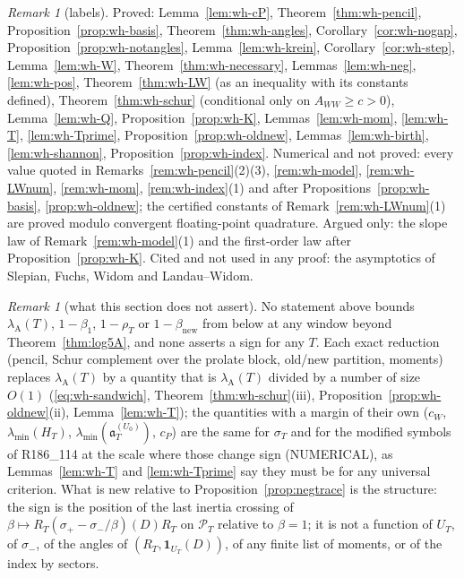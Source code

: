 \documentclass[11pt]{amsart}
\theoremstyle{definition}
\theoremstyle{remark}
\newtheorem{remark}[theorem]{Remark}
\newcommand{\PT}{\mathcal P_T}
\newcommand{\sT}{\sigma_T}
\newcommand{\DraftStandalone}{}
\begin{document}
\begin{remark}[labels]\label{rem:wh-labels}
Proved: Lemma~\ref{lem:wh-cP}, Theorem~\ref{thm:wh-pencil}, Proposition~\ref{prop:wh-basis}, Theorem~\ref{thm:wh-angles},
Corollary~\ref{cor:wh-nogap}, Proposition~\ref{prop:wh-notangles}, Lemma~\ref{lem:wh-krein}, Corollary~\ref{cor:wh-step},
Lemma~\ref{lem:wh-W}, Theorem~\ref{thm:wh-necessary}, Lemmas~\ref{lem:wh-neg}, \ref{lem:wh-pos}, Theorem~\ref{thm:wh-LW} (as an
inequality with its constants defined), Theorem~\ref{thm:wh-schur} (conditional only on $A_{WW}\ge c>0$), Lemma~\ref{lem:wh-Q},
Proposition~\ref{prop:wh-K}, Lemmas~\ref{lem:wh-mom}, \ref{lem:wh-T}, \ref{lem:wh-Tprime}, Proposition~\ref{prop:wh-oldnew},
Lemmas~\ref{lem:wh-birth}, \ref{lem:wh-shannon}, Proposition~\ref{prop:wh-index}. Numerical and not proved: every value quoted in
Remarks~\ref{rem:wh-pencil}(2)(3), \ref{rem:wh-model}, \ref{rem:wh-LWnum}, \ref{rem:wh-mom}, \ref{rem:wh-index}(1) and after
Propositions~\ref{prop:wh-basis}, \ref{prop:wh-oldnew}; the certified constants of Remark~\ref{rem:wh-LWnum}(1) are proved modulo
convergent floating-point quadrature. Argued only: the slope law of Remark~\ref{rem:wh-model}(1) and the first-order law after
Proposition~\ref{prop:wh-K}. Cited and not used in any proof: the asymptotics of Slepian, Fuchs, Widom and Landau--Widom.
\end{remark}

\begin{remark}[what this section does not assert]\label{rem:wh-honest}
No statement above bounds $\lambda_{\mathrm A}(T)$, $1-\beta_1$, $1-\rho_T$ or $1-\beta_{\mathrm{new}}$ from below at any window beyond
Theorem~\ref{thm:log5A}, and none asserts a sign for any $T$. Each exact reduction (pencil, Schur complement over the prolate block,
old/new partition, moments) replaces $\lambda_{\mathrm A}(T)$ by a quantity that is $\lambda_{\mathrm A}(T)$ divided by a number of size
$O(1)$ (\eqref{eq:wh-sandwich}, Theorem~\ref{thm:wh-schur}(iii), Proposition~\ref{prop:wh-oldnew}(ii), Lemma~\ref{lem:wh-T}); the
quantities with a margin of their own ($c_W$, $\lambda_{\min}(H_T)$, $\lambda_{\min}(\mathfrak a^{(U_0)}_T)$, $c_P$) are the same for $\sT$
and for the modified symbols of R186\_114 at the scale where those change sign (NUMERICAL), as Lemmas~\ref{lem:wh-T} and
\ref{lem:wh-Tprime} say they must be for any universal criterion. What is new relative to Proposition~\ref{prop:negtrace} is the
structure: the sign is the position of the last inertia crossing of $\beta\mapsto R_T(\sigma_+-\sigma_-/\beta)(D)R_T$ on $\PT$ relative to
$\beta=1$; it is not a function of $U_T$, of $\sigma_-$, of the angles of $(R_T,\mathbf 1_{U_T}(D))$, of any finite list of moments, or of
the index by sectors.
\end{remark}

\ifdefined\DraftStandalone
\end{document}

